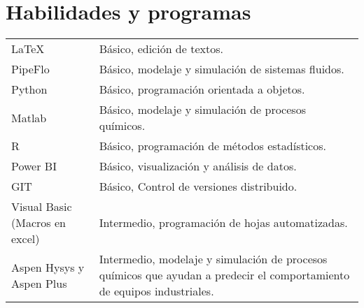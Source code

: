 \documentclass[a4paper,12pt]{article}
\begin{document}

\section{Habilidades y programas}
\begin{tabularx}{\linewidth}{@{}l X@{}}
\LaTeX &  \normalsize{Básico, edición de textos.}\\
PipeFlo &  \normalsize{Básico, modelaje y simulación de sistemas fluidos.}\\
Python &  \normalsize{Básico, programación orientada a objetos.}\\
Matlab &  \normalsize{Básico, modelaje y simulación de procesos químicos.}\\
R &  \normalsize{Básico, programación de métodos estadísticos.}\\
Power BI &  \normalsize{Básico, visualización y análisis de datos.}\\
GIT &  \normalsize{Básico, Control de versiones distribuido.}\\
Visual Basic (Macros en excel)  &  \normalsize{Intermedio, programación de hojas automatizadas.}\\ 
Aspen Hysys y Aspen Plus  &  \normalsize{Intermedio, modelaje y simulación de procesos químicos que ayudan a predecir el comportamiento de equipos industriales.}\\  
\end{tabularx}
\vfill
{}
\end{document}
